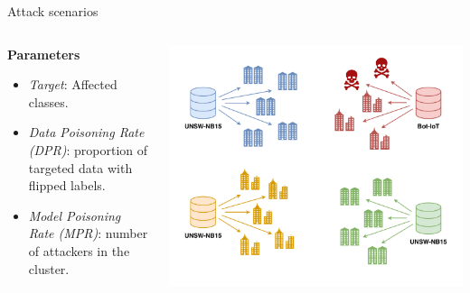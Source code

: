 \begin{frame}{Attack scenarios}
    \begin{columns}
        \begin{column}{.5\textwidth}
            \textbf{Parameters}
            \begin{itemize}
                \item \textit{Target}: Affected classes.
                \item \textit{Data Poisoning Rate (DPR)}: proportion of targeted data with flipped labels.
                \item \textit{Model Poisoning Rate (MPR)}: number of attackers in the cluster.
            \end{itemize}
        \end{column}
        \begin{column}{.5\textwidth}
        
            \includegraphics[width=.80\linewidth]{figures/eval/setup/poisoning.pdf}%
            
        \end{column}
    \end{columns}
\end{frame}

